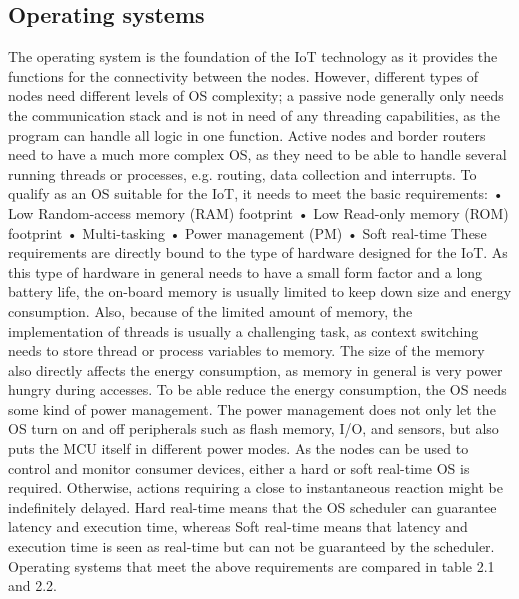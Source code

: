 \subsection{Operating systems}

The operating system is the foundation of the IoT technology as it provides the functions for the connectivity between the nodes.
However,
	different types of nodes need different levels of OS complexity;
	a passive node generally only needs the communication stack and is not in need of any threading capabilities,
	as the program can handle all logic in one function.
Active nodes and border routers need to have a much more complex OS,
	as they need to be able to handle several running threads or processes,
	e.g.
routing,
	data collection and interrupts.
To qualify as an OS suitable for the IoT,
	it needs to meet the basic requirements:
	• Low Random-access memory (RAM) footprint 
	• Low Read-only memory (ROM) footprint 
	• Multi-tasking • Power management (PM) 
	• Soft real-time These requirements are directly bound to the type of hardware designed for the IoT.
As this type of hardware in general needs to have a small form factor and a long battery life,
	the on-board memory is usually limited to keep down size and energy consumption.
Also,
	because of the limited amount of memory,
	the implementation of threads is usually a challenging task,
	as context switching needs to store thread or process variables to memory.
The size of the memory also directly affects the energy consumption,
	as memory in general is very power hungry during accesses.
To be able reduce the energy consumption,
	the OS needs some kind of power management.
The power management does not only let the OS turn on and off peripherals such as flash memory,
	I/O,
	and sensors,
	but also puts the MCU itself in different power modes.
As the nodes can be used to control and monitor consumer devices,
	either a hard or soft real-time OS is required.
Otherwise,
	actions requiring a close to instantaneous reaction might be indefinitely delayed.
Hard real-time means that the OS scheduler can guarantee latency and execution time,
	whereas Soft real-time means that latency and execution time is seen as real-time but can not be guaranteed by the scheduler.
Operating systems that meet the above requirements are compared in table 2.1 and 2.2.

